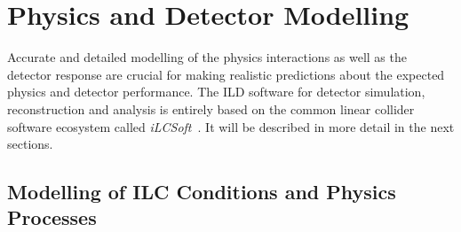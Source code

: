 %
%

\newcommand{\CPP}{C\nolinebreak\hspace{-.05em}\raisebox{.4ex}{\tiny\bf +}\nolinebreak\hspace{-.10em}\raisebox{.4ex}{\tiny\bf +}}


\chapter{ \label{chap:modelling} Physics and Detector Modelling}

Accurate and detailed modelling of the physics interactions as well as the detector
response are crucial for making realistic predictions about the expected physics and detector
performance. The ILD software for detector simulation, reconstruction and analysis is entirely
based on the common linear collider software ecosystem called \emph{iLCSoft}~\cite{bib:ilcsoft}.
It will be described in more detail in the next sections.

\section{\label{sec:generator} Modelling of ILC Conditions and Physics Processes}
%

